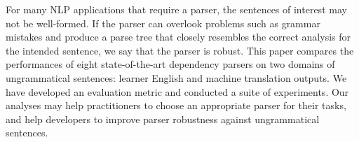 For many NLP applications that require a parser, the sentences of interest may not be well-formed. If the parser can overlook problems such as grammar mistakes and produce a parse tree that closely resembles the correct analysis for the intended sentence, we say that the parser is robust. This paper compares the performances of eight state-of-the-art dependency parsers on two domains of ungrammatical sentences: learner English and machine translation outputs. We have developed an evaluation metric and conducted a suite of experiments. Our analyses may help practitioners to choose an appropriate parser for their tasks, and help developers to improve parser robustness against ungrammatical sentences.
